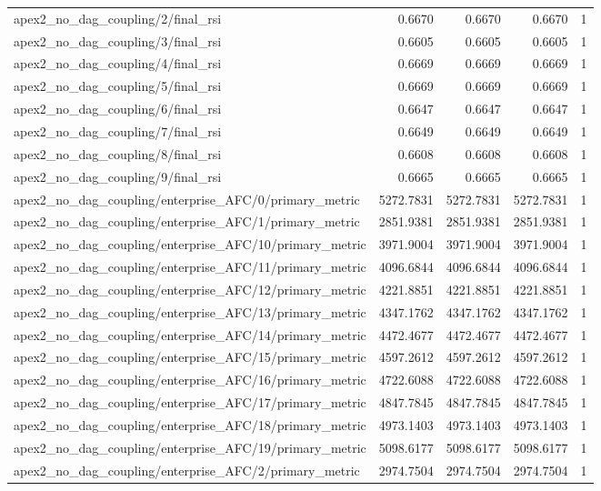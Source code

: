 \begin{table}[h]
\begin{tabular}{lrrrr}
apex2_no_dag_coupling/2/final_rsi & 0.6670 & 0.6670 & 0.6670 & 1 \\
apex2_no_dag_coupling/3/final_rsi & 0.6605 & 0.6605 & 0.6605 & 1 \\
apex2_no_dag_coupling/4/final_rsi & 0.6669 & 0.6669 & 0.6669 & 1 \\
apex2_no_dag_coupling/5/final_rsi & 0.6669 & 0.6669 & 0.6669 & 1 \\
apex2_no_dag_coupling/6/final_rsi & 0.6647 & 0.6647 & 0.6647 & 1 \\
apex2_no_dag_coupling/7/final_rsi & 0.6649 & 0.6649 & 0.6649 & 1 \\
apex2_no_dag_coupling/8/final_rsi & 0.6608 & 0.6608 & 0.6608 & 1 \\
apex2_no_dag_coupling/9/final_rsi & 0.6665 & 0.6665 & 0.6665 & 1 \\
apex2_no_dag_coupling/enterprise_AFC/0/primary_metric & 5272.7831 & 5272.7831 & 5272.7831 & 1 \\
apex2_no_dag_coupling/enterprise_AFC/1/primary_metric & 2851.9381 & 2851.9381 & 2851.9381 & 1 \\
apex2_no_dag_coupling/enterprise_AFC/10/primary_metric & 3971.9004 & 3971.9004 & 3971.9004 & 1 \\
apex2_no_dag_coupling/enterprise_AFC/11/primary_metric & 4096.6844 & 4096.6844 & 4096.6844 & 1 \\
apex2_no_dag_coupling/enterprise_AFC/12/primary_metric & 4221.8851 & 4221.8851 & 4221.8851 & 1 \\
apex2_no_dag_coupling/enterprise_AFC/13/primary_metric & 4347.1762 & 4347.1762 & 4347.1762 & 1 \\
apex2_no_dag_coupling/enterprise_AFC/14/primary_metric & 4472.4677 & 4472.4677 & 4472.4677 & 1 \\
apex2_no_dag_coupling/enterprise_AFC/15/primary_metric & 4597.2612 & 4597.2612 & 4597.2612 & 1 \\
apex2_no_dag_coupling/enterprise_AFC/16/primary_metric & 4722.6088 & 4722.6088 & 4722.6088 & 1 \\
apex2_no_dag_coupling/enterprise_AFC/17/primary_metric & 4847.7845 & 4847.7845 & 4847.7845 & 1 \\
apex2_no_dag_coupling/enterprise_AFC/18/primary_metric & 4973.1403 & 4973.1403 & 4973.1403 & 1 \\
apex2_no_dag_coupling/enterprise_AFC/19/primary_metric & 5098.6177 & 5098.6177 & 5098.6177 & 1 \\
apex2_no_dag_coupling/enterprise_AFC/2/primary_metric & 2974.7504 & 2974.7504 & 2974.7504 & 1 \\

\end{tabular}
\end{table}
